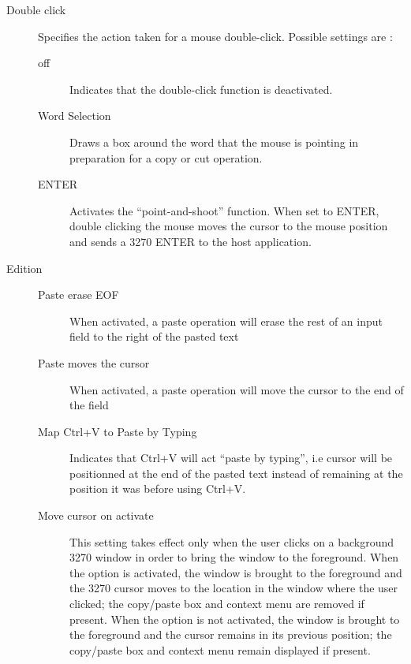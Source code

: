 \documentclass[letterpaper,10pt,english]{sphinxmanual}
\begin{document}
\begin{description}
\item[{Double click}] \leavevmode
Specifies the action taken for a mouse double-click. Possible settings are :
\begin{description}
\item[{off}] \leavevmode
Indicates that the double-click function is deactivated.

\item[{Word Selection}] \leavevmode
Draws a box around the word that the mouse is pointing in preparation for a copy or cut operation.

\item[{ENTER}] \leavevmode
Activates the “point-and-shoot” function. When set to ENTER, double clicking the mouse moves the cursor to the mouse position and sends a 3270 ENTER to the host application.

\end{description}

\item[{Edition}] \leavevmode\begin{description}
\item[{Paste erase EOF}] \leavevmode
When activated, a paste operation will erase the rest of an input field to the right of the pasted text

\item[{Paste moves the cursor}] \leavevmode
When activated, a paste operation will move the cursor to the end of the field

\item[{Map Ctrl+V to Paste by Typing}] \leavevmode
Indicates that Ctrl+V will act “paste by typing”, i.e cursor will be positionned at the end of the pasted text instead of remaining at the position it was before using Ctrl+V.

\item[{Move cursor on activate}] \leavevmode
This setting takes effect only when the user clicks on a background 3270 window in order to bring the window to the foreground. When the option is activated, the window is brought to the foreground and the 3270 cursor moves to the location in the window where the user clicked; the copy/paste box and context menu are removed if present. When the option is not activated, the window is brought to the foreground and the cursor remains in its previous position; the copy/paste box and context menu remain displayed if present.


\end{description}
\end{description}
\end{document}
